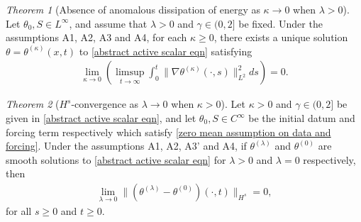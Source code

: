 \documentclass[reqno]{amsart}%
\theoremstyle{definition}
\theoremstyle{remark}
\numberwithin{equation}{section}
\newtheorem{theorem}{Theorem}
\newcommand{\thetalambda}{\theta^{(\lambda)}}
\newcommand{\1}{\mathbf{1}}
\numberwithin{equation}{section}
\numberwithin{theorem}{section}
\numberwithin{figure}{section}
\begin{document}
\begin{theorem}[Absence of anomalous dissipation of energy as $\kappa\to0$ when $\lambda>0$]\label{absence of anomalous dissipation thm}
Let $\theta_0,S\in L^\infty$, and assume that $\lambda>0$ and $\gamma\in(0,2]$ be fixed. Under the assumptions A1, A2, A3 and A4, for each $\kappa\ge0$, there exists a unique solution $\theta=\theta^{(\kappa)}(x,t)$ to \eqref{abstract active scalar eqn} satisfying
\begin{align}\label{absence of anomalous dissipation identity}
\lim_{\kappa\to0}\left(\limsup_{t\to\infty}\int_{0}^{t}\|\nabla\theta^{(\kappa)}(\cdot,s)\|_{L^2}^2ds\right)=0.
\end{align}
\end{theorem}

\begin{theorem}[$H^s$-convergence as $\lambda\rightarrow0$ when $\kappa>0$]\label{Hs convergence theorem}
Let $\kappa>0$ and $\gamma\in(0,2]$ be given in \eqref{abstract active scalar eqn}, and let $\theta_0,S\in C^\infty$ be the initial datum and forcing term respectively which satisfy \eqref{zero mean assumption on data and forcing}. Under the assumptions A1, A2, A3' and A4, if $\thetalambda$ and $\theta^{(0)}$ are smooth solutions to \eqref{abstract active scalar eqn} for $\lambda>0$ and $\lambda=0$ respectively, then 
\begin{align}\label{Hs convergence thm} 
\lim_{\lambda\rightarrow0}\|(\thetalambda-\theta^{(0)})(\cdot,t)\|_{H^s}=0,
\end{align}
for all $s\ge0$ and $t\ge0$.
\end{theorem}
\end{document}
